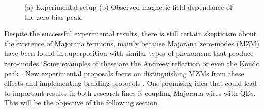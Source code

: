 \begin{figure}[t]
\centering

\caption{ (a) Experimental setup (b) Observed magnetic field dependance of the zero bias peak.  \label{fig:exp}\protect{}}
\end{figure}

Despite the successful experimental results, there is still certain  skepticism about the existence of Majorana fermions, mainly because Majorana zero-modes (MZM) have been found in superposition with similar types of phenomena that produce zero-modes. Some examples of these are the Andreev reflection \cite{sarma_majorana_2012} or even the Kondo peak \cite{gorski_interplay_2018}. New experimental proposals focus on distinguishing MZMs from these effects and implementing  braiding protocols \cite{aasen_milestones_2016,sarma_majorana_2015,heck_coulomb-assisted_2012} . One promising idea that could lead to important results in both research lines is coupling Majorana wires with QDs. This will be the objective of the following section. 


